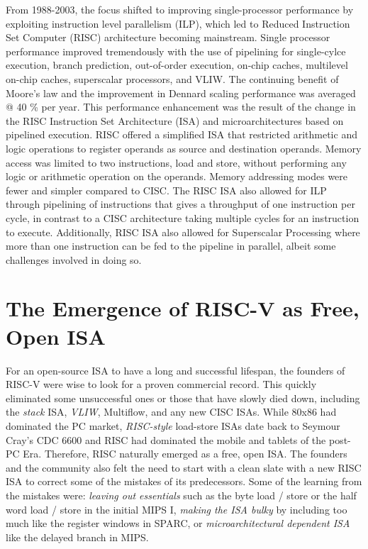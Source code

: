 \documentclass[journal]{IEEEtran}
\begin{document}
From 1988-2003, the focus shifted to improving single-processor performance by exploiting instruction level parallelism (ILP), which led to Reduced Instruction Set Computer (RISC) architecture \cite{patterson_risc_1998} becoming mainstream. Single processor performance improved tremendously with the use of pipelining for single-cylce execution, branch prediction, out-of-order execution, on-chip caches, multilevel on-chip caches, superscalar processors, and VLIW. The continuing benefit of Moore's law and the improvement in Dennard scaling performance was averaged @ 40 \% per year.
This performance enhancement was the result of the change in the RISC Instruction Set Architecture (ISA) and microarchitectures based on pipelined execution. RISC offered a simplified ISA that restricted arithmetic and logic operations to register operands as source and destination operands. Memory access was limited to two instructions, load and store, without performing any logic or arithmetic operation on the operands. Memory addressing modes were fewer and simpler compared to CISC. The RISC ISA also allowed for ILP through pipelining of instructions that gives a throughput of one instruction per cycle, in contrast to a CISC architecture taking multiple cycles for an instruction to execute. Additionally, RISC ISA also allowed for Superscalar Processing where more than one instruction can be fed to the pipeline in parallel, albeit some challenges involved in doing so.

 
\section{The Emergence of RISC-V as Free, Open ISA }
For an open-source ISA to have a long and successful lifespan, the founders of RISC-V were wise to look for a proven commercial record. This quickly eliminated some unsuccessful ones or those that have slowly died down, including the \textit{ stack} ISA, \textit{VLIW}, Multiflow, and any new CISC ISAs. While 80x86 had dominated the PC market, \textit{RISC-style} load-store ISAs date back to Seymour Cray's CDC 6600 and RISC had dominated the mobile and tablets of the post-PC Era. Therefore, RISC naturally emerged as a free, open ISA. The founders and the community also felt the need to start with a clean slate with a new RISC ISA to correct some of the mistakes of its predecessors. Some of the learning from the mistakes were: \textit{leaving out essentials} such as the byte load / store or the half word load / store in the initial MIPS I, \textit{making the ISA bulky} by including too much like the register windows in SPARC, or \textit{microarchitectural dependent ISA} like the delayed branch in MIPS. 
\end{document}
